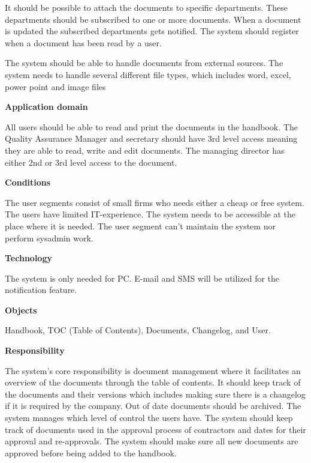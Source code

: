 It should be possible to attach the documents to specific departments. These departments should be subscribed to one or more documents. When a document is updated the subscribed departments gets notified. The system should register when a document has been read by a user.

The system should be able to handle documents from external sources. The system needs to handle several different file types, which includes word, excel, power point and image files

\textbf{Application domain}

All users should be able to read and print the documents in the handbook. The Quality Assurance Manager and secretary should have 3rd level access meaning they are able to read, write and edit documents. The managing director has either 2nd or 3rd level access to the document.

\textbf{Conditions}

The user segments consist of small firms who needs either a cheap or free system. The users have limited IT-experience. The system needs to be accessible at the place where it is needed. The user segment can’t maintain the system nor perform sysadmin work.

\textbf{Technology}

The system is only needed for PC. E-mail and SMS will be utilized for the notification feature.

\textbf{Objects}

Handbook, TOC (Table of Contents), Documents, Changelog, and User.

\textbf{Responsibility}

The system’s core responsibility is document management where it facilitates an overview of the documents through the table of contents. It should keep track of the documents and their versions which includes making sure there is a changelog if it is required by the company. Out of date documents should be archived. The system manages which level of control the users have. The system should keep track of documents used in the approval process of contractors and dates for their approval and re-approvals. The system should make sure all new documents are approved before being added to the handbook.
